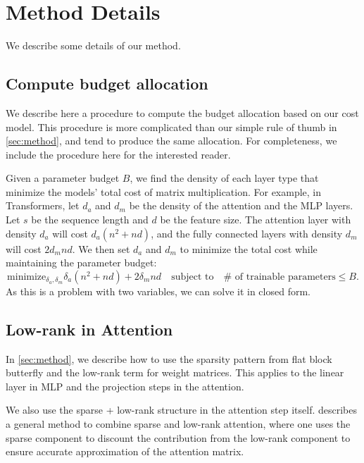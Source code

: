 \section{Method Details}
\label{sec:appx_method_details}

We describe some details of our method.
\subsection{Compute budget allocation}

We describe here a procedure to compute the budget allocation
based on our cost model.
This procedure is more complicated than our simple rule of thumb in
\cref{sec:method}, and tend to produce the same allocation.
For completeness, we include the procedure here for the interested reader.

Given a parameter budget $B$, we find the density of each layer type that
minimize the models' total cost of matrix multiplication.
For example, in Transformers, let $d_a$ and $d_m$ be the density of the
attention and the MLP layers.
Let $s$ be the sequence length and $d$ be the feature size.
The attention layer with density $d_a$ will cost $d_a (n^2 + nd)$, and the fully
connected layers with density $d_m$ will cost $2 d_m nd$.
We then set $d_a$ and $d_m$ to minimize the total cost while maintaining the
parameter budget:
\begin{equation}\label{eq:budget}
  \text{minimize}_{\delta_a, \delta_m} \delta_a (n^2 + nd) + 2 \delta_m n d \quad
  \text{subject to} \quad \text{$\#$ of trainable parameters} \leq B.
\end{equation}
As this is a problem with two variables, we can solve it in closed form.

\subsection{Low-rank in Attention}

In \cref{sec:method}, we describe how to use the sparsity pattern from flat
block butterfly and the low-rank term for weight matrices.
This applies to the linear layer in MLP and the projection steps in the
attention.

We also use the sparse + low-rank structure in the attention step itself.
\citet{scatterbrain} describes a general method to combine sparse and low-rank
attention, where one uses the sparse component to discount the contribution from
the low-rank component to ensure accurate approximation of the attention matrix.

